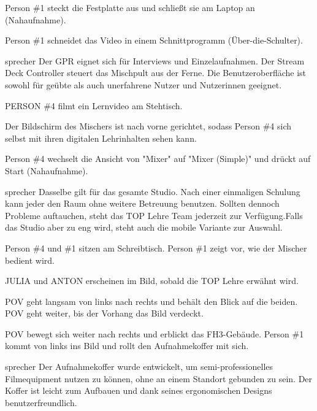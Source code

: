 \documentclass{screenplay}
\begin{document}
	Person \#1 steckt die Festplatte aus und schließt sie am Laptop an (Nahaufnahme).
	
	Person \#1 schneidet das Video in einem Schnittprogramm (Über-die-Schulter).
	
	\begin{dialogue}{sprecher}
		Der GPR eignet sich für Interviews und Einzelaufnahmen. Der Stream Deck Controller steuert das Mischpult aus der Ferne. Die Benutzeroberfläche ist sowohl für geübte als auch unerfahrene Nutzer und Nutzerinnen geeignet.
	\end{dialogue}
	
	PERSON \#4 filmt ein Lernvideo am Stehtisch.
	
	Der Bildschirm des Mischers ist nach vorne gerichtet, sodass Person \#4 sich selbst mit ihren digitalen Lehrinhalten sehen kann.
	
	Person \#4 wechselt die Ansicht von "Mixer" auf "Mixer (Simple)" und drückt auf Start (Nahaufnahme).
	
	\begin{dialogue}{sprecher}
		Dasselbe gilt für das gesamte Studio. Nach einer einmaligen Schulung kann jeder den Raum ohne weitere Betreuung benutzen. Sollten dennoch Probleme auftauchen, steht das TOP Lehre Team jederzeit zur Verfügung.Falls das Studio aber zu eng wird, steht auch die mobile Variante zur Auswahl.
	\end{dialogue}
	
	Person \#4 und \#1 sitzen am Schreibtisch. Person \#1 zeigt vor, wie der Mischer bedient wird.
	
	JULIA und ANTON erscheinen im Bild, sobald die TOP Lehre erwähnt wird.
	
	POV geht langsam von links nach rechts und behält den Blick auf die beiden. POV geht weiter, bis der Vorhang das Bild verdeckt.
	
	
	POV bewegt sich weiter nach rechts und erblickt das FH3-Gebäude. Person \#1 kommt von links ins Bild und rollt den Aufnahmekoffer mit sich.
	
	\begin{dialogue}{sprecher}
		Der Aufnahmekoffer wurde entwickelt, um semi-professionelles Filmequipment nutzen zu können, ohne an einem Standort gebunden zu sein. Der Koffer ist leicht zum Aufbauen und dank seines ergonomischen Designs benutzerfreundlich.
	\end{dialogue}
	
	
\end{document}
